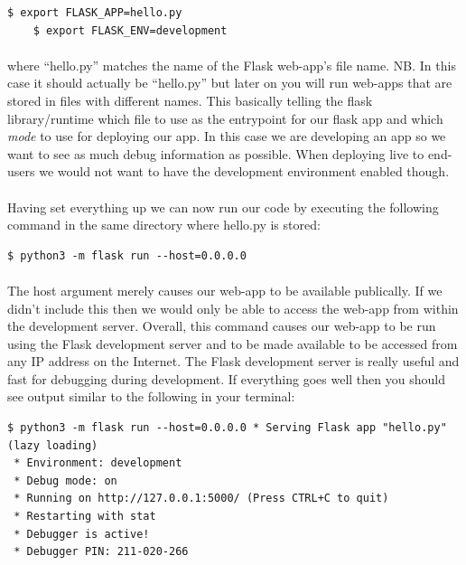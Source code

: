 \documentclass[12pt, a4paper, oneside]{book}
\begin{document}
\begin{lstlisting}[style=DOS]
    $ export FLASK_APP=hello.py
    $ export FLASK_ENV=development
\end{lstlisting}

\paragraph{} where ``hello.py'' matches the name of the Flask web-app's file name. NB. In this case it should actually be ``hello.py'' but later on you will run web-apps that are stored in files with different names. This basically telling the flask library/runtime which file to use as the entrypoint for our flask app and which \emph{mode} to use for deploying our app. In this case we are developing an app so we want to see as much debug information as possible. When deploying live to end-users we would not want to have the development environment enabled though.

\paragraph{} Having set everything up we can now run our code by executing the following command in the same directory where hello.py is stored:

\begin{lstlisting}[style=DOS]
    $ python3 -m flask run --host=0.0.0.0
\end{lstlisting}

\paragraph{} The host argument merely causes our web-app to be available publically. If we didn't include this then we would only be able to access the web-app from within the development server. Overall, this command causes our web-app to be run using the Flask development server and to be made available to be accessed from any IP address on the Internet. The Flask development server is really useful and fast for debugging during development. If everything goes well then you should see output similar to the following in your terminal:

\begin{lstlisting}[style=DOS]
    $ python3 -m flask run --host=0.0.0.0 * Serving Flask app "hello.py" (lazy loading)
 * Environment: development
 * Debug mode: on
 * Running on http://127.0.0.1:5000/ (Press CTRL+C to quit)
 * Restarting with stat
 * Debugger is active!
 * Debugger PIN: 211-020-266
 \end{lstlisting}
\end{document}
